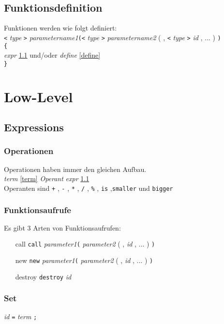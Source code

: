 \documentclass{article}
\begin{document}
\subsection{Funktionsdefinition} \label{function}
Funktionen werden wie folgt definiert: \\
\texttt{<} \textit{type} \texttt{>} \textit{parametername1}\texttt{(<} \textit{type} \texttt{>} \textit{parametername2}  {\small( , \texttt{<} \textit{type} \texttt{>} \textit{id} , ... )} \texttt{)}\\
\texttt{\{}\\
\textit{expr} {\tiny\ref{expr}} und/oder \textit{define} {\tiny\ref{define}}\\
\texttt{\}}


\section{Low-Level}

\subsection{Expressions} \label{expr}
\subsubsection{Operationen}
Operationen haben immer den gleichen Aufbau.\\
\textit{term} {\tiny\ref{term}} \textit{Operant} \textit{expr} {\tiny\ref{expr}}\\
Operanten sind \texttt{+} , \texttt{-} , \texttt{*} , \texttt{/} , \texttt{\%} , \texttt{is} ,\texttt{smaller} und \texttt{bigger} 

\subsubsection{Funktionsaufrufe}
Es gibt 3 Arten von Funktionsaufrufen:
\begin{itemize}
\item[call]{\texttt{call} \textit{parameter1}\texttt{(} \textit{parameter2}  {\tiny( , \textit{id} , ... )} \texttt{)} }
\item[new]{\texttt{new} \textit{parameter1}\texttt{(} \textit{parameter2}  {\tiny( , \textit{id} , ... )} \texttt{)} }
\item[destroy]{\texttt{destroy} \textit{id}}
\end{itemize}

\subsubsection{Set}
\textit{id} \texttt{=} \textit{term} \texttt{;}
\end{document}
